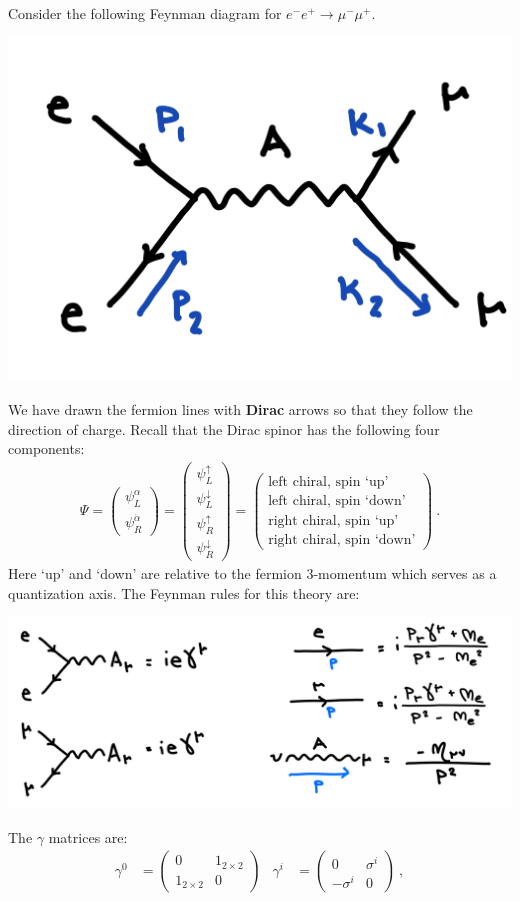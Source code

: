 \documentclass[12pt]{article}
\begin{document}
Consider the following Feynman diagram for $e^-e^+ \to \mu^-\mu^+$. 
\begin{center}
\includegraphics[width=.4\textwidth]{HW7b.png}	
\end{center}
We have drawn the fermion lines with \textbf{Dirac} arrows so that they follow the direction of charge. Recall that the Dirac spinor has the following four components:
\begin{align}
	\Psi =
	\begin{pmatrix}
	\psi_L^\alpha
	\\
	\psi_R^{\dot\alpha}
	\end{pmatrix}
	=
	 \begin{pmatrix}
		\psi_L^\uparrow \\
		\psi_L^\downarrow \\
		\psi_R^\uparrow \\
		\psi_R^\downarrow
	\end{pmatrix}
	=
	\begin{pmatrix}
		\text{left chiral, spin `up'} \\
		\text{left chiral, spin `down'} \\
		\text{right chiral, spin `up'} \\
		\text{right chiral, spin `down'}
	\end{pmatrix} \ .
\end{align}
Here `up' and `down' are relative to the fermion 3-momentum which serves as a quantization axis. The Feynman rules for this theory are:
\begin{center}
\includegraphics[width=.7\textwidth]{HW7bb.png}	
\end{center}
The $\gamma$ matrices are:
\begin{align}
	\gamma^0 &= 
	\begin{pmatrix}
		0 & 1_{2\times 2} \\
		1_{2\times 2} & 0 
	\end{pmatrix}
	&
	\gamma^i &= 
	\begin{pmatrix}
		0 & \sigma^i \\
		-\sigma^i & 0 
	\end{pmatrix} \ ,
\end{align}
\end{document}
